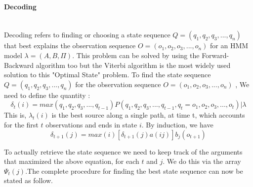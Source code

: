 \paragraph{Decoding} \mbox{}\\
Decoding refers to finding or choosing  a state sequence $ Q = (q_{1},q_{2},q_{3},...,q_{n}) $ that best explains the observation sequence $ O = (o_{1},o_{2},o_{3},...,o_{n}) $ for an HMM model $ \lambda = (A,B, \Pi ) $. This problem can be solved by using the Forward-Backward algorithm too but the Viterbi algorithm is the most widely used solution to this "Optimal State" problem. To find the state sequence $ Q = (q_{1},q_{2},q_{3},...,q_{n}) $ for the observation sequence $ O = (o_{1},o_{2},o_{3},...,o_{n}) $ , We need to define the quantity :
\begin{equation} \delta_{t}(i) = max(q_{1},q_{2},q_{3},...,q_{t-1})P(q_{1},q_{2},q_{3},...,q_{t-1},q_{t}=o_{1},o_{2},o_{3},...,o_{t}) | \lambda \end{equation}
This is, $\lambda_{t}(i)$ is the best source along a single path, at time t, which
accounts for the first $t$ observations and ends in state $i$. By induction, we have
\begin{equation} \delta_{t+1}(j) = max(i)[\delta_{t+1}(j)a(ij)]b_{j}(o_{t+1}) \end{equation}

To actually retrieve the state sequence we need to keep track of the arguments that
maximized the above equation, for each $t$ and $j$. We do this via the array $\Psi_{t}(j)$.The complete
procedure for finding the best state sequence can now be stated as follow.

